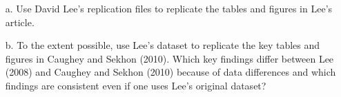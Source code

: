\documentclass{article}
\begin{document}
\begin{enumerate}
\item[a.] Use David Lee's replication files to replicate the tables
  and figures in Lee's article.

\item[b.] To the extent possible, use Lee's dataset to replicate the
  key tables and figures in Caughey and Sekhon (2010). Which key
  findings differ between Lee (2008) and Caughey and Sekhon (2010)
  because of data differences and which findings are consistent even
  if one uses Lee's original dataset?


\end{enumerate}
\end{document}
